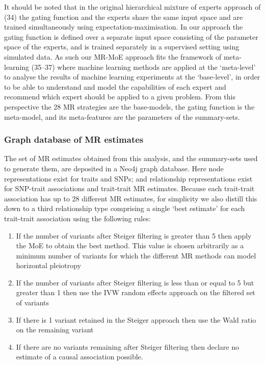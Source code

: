 \documentclass[]{article}
\providecommand{\tightlist}{%
  \setlength{\itemsep}{0pt}\setlength{\parskip}{0pt}}
\begin{document}
It should be noted that in the original hierarchical mixture of experts
approach of (34) the gating function and the experts share the same
input space and are trained simultaneously using
expectation-maximisation. In our approach the gating function is defined
over a separate input space consisting of the parameter space of the
experts, and is trained separately in a supervised setting using
simulated data. As such our MR-MoE approach fits the framework of
meta-learning (35--37) where machine learning methods are applied at the
`meta-level' to analyse the results of machine learning experiments at
the `base-level', in order to be able to understand and model the
capabilities of each expert and recommend which expert should be applied
to a given problem. From this perspective the 28 MR strategies are the
base-models, the gating function is the meta-model, and its
meta-features are the parameters of the summary-sets.

\subsubsection{Graph database of MR
estimates}\label{graph-database-of-mr-estimates}

The set of MR estimates obtained from this analysis, and the
summary-sets used to generate them, are deposited in a Neo4j graph
database. Here node representations exist for traits and SNPs; and
relationship representations exist for SNP-trait associations and
trait-trait MR estimates. Because each trait-trait association has up to
28 different MR estimates, for simplicity we also distill this down to a
third relationship type comprising a single `best estimate' for each
trait-trait association using the following rules:

\begin{enumerate}
\def\labelenumi{\arabic{enumi}.}
\tightlist
\item
  If the number of variants after Steiger filtering is greater than 5
  then apply the MoE to obtain the best method. This value is chosen
  arbitrarily as a minimum number of variants for which the different MR
  methods can model horizontal pleiotropy
\item
  If the number of variants after Steiger filtering is less than or
  equal to 5 but greater than 1 then use the IVW random effects approach
  on the filtered set of variants
\item
  If there is 1 variant retained in the Steiger approach then use the
  Wald ratio on the remaining variant
\item
  If there are no variants remaining after Steiger filtering then
  declare no estimate of a causal association possible.
\end{enumerate}
\end{document}
